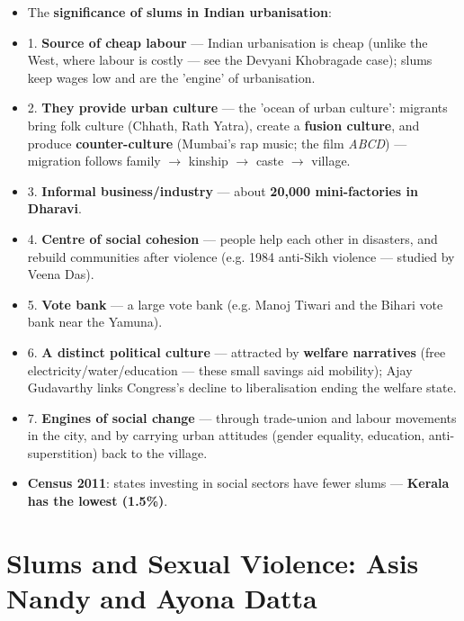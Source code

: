 \begin{KeyConcept}
\begin{itemize}
\item The \textbf{significance of slums in Indian urbanisation}:
\item 1. \textbf{Source of cheap labour} --- Indian urbanisation is cheap (unlike the West, where labour is costly --- see the Devyani Khobragade case); slums keep wages low and are the 'engine' of urbanisation.
\item 2. \textbf{They provide urban culture} --- the 'ocean of urban culture': migrants bring folk culture (Chhath, Rath Yatra), create a \textbf{fusion culture}, and produce \textbf{counter-culture} (Mumbai's rap music; the film \emph{ABCD}) --- migration follows family $\rightarrow$ kinship $\rightarrow$ caste $\rightarrow$ village.
\item 3. \textbf{Informal business/industry} --- about \textbf{20,000 mini-factories in Dharavi}.
\item 4. \textbf{Centre of social cohesion} --- people help each other in disasters, and rebuild communities after violence (e.g. 1984 anti-Sikh violence --- studied by Veena Das).
\item 5. \textbf{Vote bank} --- a large vote bank (e.g. Manoj Tiwari and the Bihari vote bank near the Yamuna).
\item 6. \textbf{A distinct political culture} --- attracted by \textbf{welfare narratives} (free electricity/water/education --- these small savings aid mobility); Ajay Gudavarthy links Congress's decline to liberalisation ending the welfare state.
\item 7. \textbf{Engines of social change} --- through trade-union and labour movements in the city, and by carrying urban attitudes (gender equality, education, anti-superstition) back to the village.
\item \textbf{Census 2011}: states investing in social sectors have fewer slums --- \textbf{Kerala has the lowest (1.5\%)}.
\end{itemize}
\end{KeyConcept}

\section{Slums and Sexual Violence: Asis Nandy and Ayona Datta}

